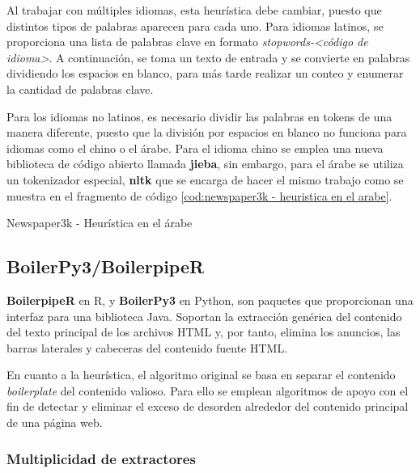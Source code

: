 Al trabajar con múltiples idiomas, esta heurística debe cambiar, puesto que distintos tipos de palabras
aparecen para cada uno. Para idiomas latinos, se proporciona una lista de palabras clave en formato 
\emph{stopwords-<código de idioma>}. A continuación, se toma un texto de entrada y se convierte en palabras 
dividiendo los espacios en blanco, para más tarde realizar un conteo y enumerar la cantidad de palabras 
clave.

Para los idiomas no latinos, es necesario dividir las palabras en tokens de una manera diferente, puesto
que la división por espacios en blanco no funciona para idiomas como el chino o el árabe. Para el idioma
chino se emplea una nueva biblioteca de código abierto llamada \textbf{jieba}, sin embargo, para el árabe
se utiliza un tokenizador especial, \textbf{nltk} que se encarga de hacer el mismo trabajo como se muestra 
en el fragmento de código \ref{cod:newspaper3k - heuristica en el arabe}.

\begin{codefloat}
  
  \caption{Newspaper3k - Heurística en el árabe}
  \label{cod:newspaper3k - heuristica en el arabe}
\end{codefloat}

\subsection{BoilerPy3/BoilerpipeR}
\label{subsec:boilerpy/boilerpiper}

\textbf{BoilerpipeR} \cite{boilerpipeR-cran} en R, y \textbf{BoilerPy3} \cite{boilerpy} en Python, son 
paquetes que proporcionan una interfaz para una biblioteca Java. Soportan la extracción genérica del 
contenido del texto principal de los archivos HTML y, por tanto, elimina los anuncios, las barras laterales 
y cabeceras del contenido fuente HTML.

En cuanto a la heurística, el algoritmo original se basa en separar el contenido \emph{boilerplate} del 
contenido valioso. Para ello se emplean algoritmos de apoyo con el fin de detectar y eliminar el exceso de 
desorden alrededor del contenido principal de una página web.

\subsubsection{Multiplicidad de extractores}
\label{subsubsec:multiplicidad de extractores}

